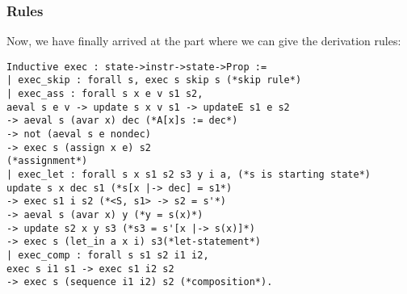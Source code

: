 \subsubsection{Rules}
Now, we have finally arrived at the part where we can give the derivation rules:
\begin{verbatim}
Inductive exec : state->instr->state->Prop :=
| exec_skip : forall s, exec s skip s (*skip rule*)
| exec_ass : forall s x e v s1 s2,
aeval s e v -> update s x v s1 -> updateE s1 e s2
-> aeval s (avar x) dec (*A[x]s := dec*)
-> not (aeval s e nondec)
-> exec s (assign x e) s2
(*assignment*)
| exec_let : forall s x s1 s2 s3 y i a, (*s is starting state*)
update s x dec s1 (*s[x |-> dec] = s1*)
-> exec s1 i s2 (*<S, s1> -> s2 = s'*)
-> aeval s (avar x) y (*y = s(x)*)
-> update s2 x y s3 (*s3 = s'[x |-> s(x)]*)
-> exec s (let_in a x i) s3(*let-statement*)
| exec_comp : forall s s1 s2 i1 i2,
exec s i1 s1 -> exec s1 i2 s2 
-> exec s (sequence i1 i2) s2 (*composition*).
\end{verbatim}



